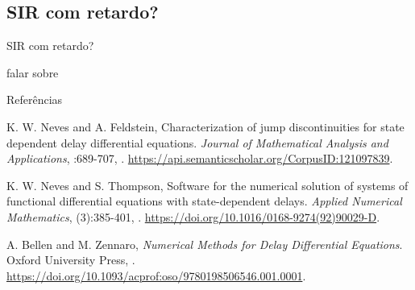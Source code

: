 \documentclass{beamer}
\theoremstyle{plain}
\theoremstyle{definition}
\begin{document}

\subsection{SIR com retardo?}
\begin{frame}{SIR com retardo?}

    falar sobre 
     
\end{frame}


\begin{frame}{Referências}


\begin{thebibliography}{3}



\beamertemplatearticlebibitems
{}
K. W. Neves and A. Feldstein,
\newblock Characterization of jump discontinuities for state dependent delay differential equations.
\newblock \emph{Journal of Mathematical Analysis and Applications},
:689-707,
.
\newblock \url{https://api.semanticscholar.org/CorpusID:121097839}.


\beamertemplatearticlebibitems
{}
K. W. Neves and S. Thompson,
\newblock Software for the numerical solution of systems of functional differential equations with state-dependent delays.
\newblock \emph{Applied Numerical Mathematics},
(3):385-401,
.
\newblock \url{https://doi.org/10.1016/0168-9274(92)90029-D}.


\beamertemplatebookbibitems
{}
A. Bellen and M. Zennaro,
\newblock \emph{Numerical Methods for Delay Differential Equations}.
\newblock Oxford University Press,
.
\newblock \url{https://doi.org/10.1093/acprof:oso/9780198506546.001.0001}.
 
\end{thebibliography}
\end{frame}

\end{document}
